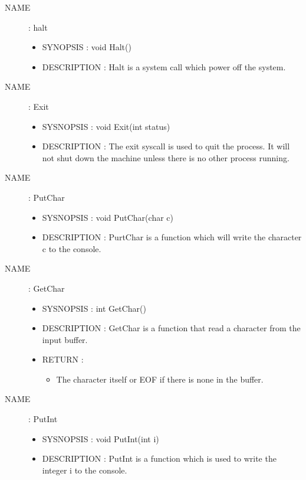 \documentclass[a4paper,10pt]{article}
\begin{document}
\begin{description}
    \item [NAME] : halt
        \begin{itemize}
            \item SYNOPSIS : void Halt()
            \item DESCRIPTION :
                Halt is a system call which power off the system.
        \end{itemize}


    \item [NAME] : Exit
        \begin{itemize}
            \item SYSNOPSIS : void Exit(int status)
            \item DESCRIPTION :
                The exit syscall is used to quit the process. It will not shut down the
                machine unless there is no other process running.
        \end{itemize}

    \item [NAME] : PutChar
        \begin{itemize}
            \item SYSNOPSIS : void PutChar(char c)
            \item DESCRIPTION :
                PurtChar is a function which will write the character c to the console.
        \end{itemize}

    \item [NAME] : GetChar
        \begin{itemize}
            \item SYSNOPSIS : int GetChar()
            \item DESCRIPTION :
                GetChar is a function that read a character from the input buffer.
            \item RETURN :
                \begin{itemize}
                    \item The character itself or EOF if there is none in the buffer.
                \end{itemize}
        \end{itemize}

    \item [NAME] : PutInt
        \begin{itemize}
            \item SYSNOPSIS : void PutInt(int i)
            \item DESCRIPTION :
                PutInt is a function which is used to write the integer i to the console.
        \end{itemize}


\end{description}
\end{document}
